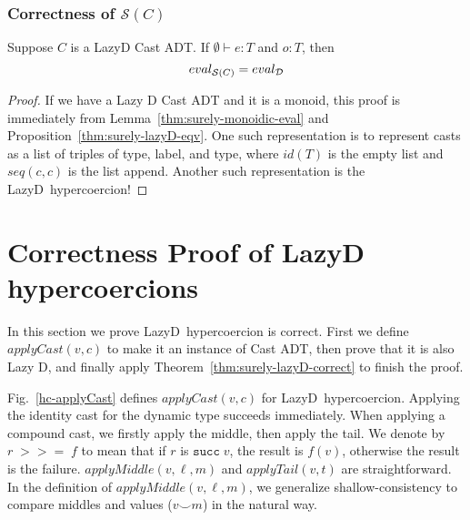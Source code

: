 \documentclass[acmsmall,review,anonymous]{acmart}\settopmatter{printfolios=true,printccs=false,printacmref=false}
\newcommand{\figref}[1]{Fig.~\ref{#1}}
\newcommand{\judgetype}[3]{#1 \vdash #2 : #3}
\newcommand{\lazyD}{Lazy\;D}
\newcommand{\rOOsucc}[1]{\mathtt{succ}\;#1}
\newcommand{\ineffCEKD}{$\mathcal{D}$}
\newcommand{\effCEK}[1]{$\mathcal{S}(#1)$}
\newcommand{\evalEqv}[2]{\ensuremath{eval_{\text{#1}} = eval_{\text{#2}}}}
\begin{document}
\subsubsection{Correctness of \effCEK{C}}

\begin{theorem}[\effCEK{C} is correct wrt. \ineffCEKD{}]
  \label{thm:surely-lazyD-correct}
  Suppose $C$ is a \lazyD{} Cast ADT.  If
  $\judgetype{\emptyset}{e}{T}$ and $o : T$, then
  \[
  \text{\evalEqv{\effCEK{C}}{\ineffCEKD}}
  \]
\end{theorem}
\begin{proof}
  If we have a Lazy D Cast ADT and it is a monoid, this 
  proof is immediately from Lemma~\ref{thm:surely-monoidic-eval} and 
  Proposition~\ref{thm:surely-lazyD-eqv}. One such representation is to 
  represent casts as a list of triples of type, label, and type, where 
  $id(T)$ is the empty list and $seq(c,c)$ is the list append. Another such 
  representation is the \lazyD\ hypercoercion!
\end{proof}


\section{Correctness Proof of \lazyD{} hypercoercions}
\label{sec:hypercoercion-correctness}

In this section we prove \lazyD\ hypercoercion is 
correct. First we define $applyCast(v,c)$ to make it an instance of Cast ADT, 
then prove that it is also Lazy D, and finally apply 
Theorem~\ref{thm:surely-lazyD-correct} to finish the proof.

\figref{hc-applyCast} defines $applyCast(v,c)$ for \lazyD\ hypercoercion. 
Applying the identity cast for the 
dynamic type succeeds immediately. When applying a compound cast, we firstly 
apply the middle, then apply the tail. We denote by $r \; >>= \; f$ to mean 
that if $r$ is $\rOOsucc{v}$, the result is $f(v)$, otherwise the result 
is the failure.
$ applyMiddle(v,\ell,m)$ and $applyTail(v,t)$ are straightforward.
In the definition of $applyMiddle(v,\ell,m)$, we generalize 
shallow-consistency to compare middles and values ($v \smile m$) in the 
natural way.
\end{document}
